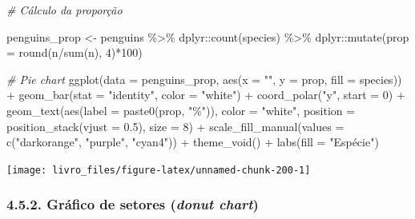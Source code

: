 \documentclass[
]{book}
\newenvironment{Shaded}{\begin{snugshade}}{\end{snugshade}}
\newcommand{\AttributeTok}[1]{\textcolor[rgb]{0.61,0.61,0.61}{#1}}
\newcommand{\CommentTok}[1]{\textcolor[rgb]{0.37,0.37,0.37}{\textit{#1}}}
\newcommand{\DecValTok}[1]{\textcolor[rgb]{0.06,0.06,0.06}{#1}}
\newcommand{\FloatTok}[1]{\textcolor[rgb]{0.06,0.06,0.06}{#1}}
\newcommand{\FunctionTok}[1]{\textcolor[rgb]{0,0,0}{#1}}
\newcommand{\NormalTok}[1]{#1}
\newcommand{\OtherTok}[1]{\textcolor[rgb]{0.37,0.37,0.37}{#1}}
\newcommand{\SpecialCharTok}[1]{\textcolor[rgb]{0,0,0}{#1}}
\newcommand{\StringTok}[1]{\textcolor[rgb]{0.5,0.5,0.5}{#1}}
\begin{document}
\begin{Shaded}
\begin{Highlighting}[]
\CommentTok{\# Cálculo da proporção}

\NormalTok{penguins\_prop }\OtherTok{\textless{}{-}}\NormalTok{ penguins }\SpecialCharTok{\%\textgreater{}\%}
\NormalTok{  dplyr}\SpecialCharTok{::}\FunctionTok{count}\NormalTok{(species) }\SpecialCharTok{\%\textgreater{}\%} 
\NormalTok{  dplyr}\SpecialCharTok{::}\FunctionTok{mutate}\NormalTok{(}\AttributeTok{prop =} \FunctionTok{round}\NormalTok{(n}\SpecialCharTok{/}\FunctionTok{sum}\NormalTok{(n), }\DecValTok{4}\NormalTok{)}\SpecialCharTok{*}\DecValTok{100}\NormalTok{)}

\CommentTok{\# Pie chart}
\FunctionTok{ggplot}\NormalTok{(}\AttributeTok{data =}\NormalTok{ penguins\_prop, }\FunctionTok{aes}\NormalTok{(}\AttributeTok{x =} \StringTok{""}\NormalTok{, }\AttributeTok{y =}\NormalTok{ prop, }\AttributeTok{fill =}\NormalTok{ species)) }\SpecialCharTok{+} 
  \FunctionTok{geom\_bar}\NormalTok{(}\AttributeTok{stat =} \StringTok{"identity"}\NormalTok{, }\AttributeTok{color =} \StringTok{"white"}\NormalTok{) }\SpecialCharTok{+}
  \FunctionTok{coord\_polar}\NormalTok{(}\StringTok{"y"}\NormalTok{, }\AttributeTok{start =} \DecValTok{0}\NormalTok{) }\SpecialCharTok{+}
  \FunctionTok{geom\_text}\NormalTok{(}\FunctionTok{aes}\NormalTok{(}\AttributeTok{label =} \FunctionTok{paste0}\NormalTok{(prop, }\StringTok{"\%"}\NormalTok{)), }\AttributeTok{color =} \StringTok{"white"}\NormalTok{, }
            \AttributeTok{position =} \FunctionTok{position\_stack}\NormalTok{(}\AttributeTok{vjust =} \FloatTok{0.5}\NormalTok{), }\AttributeTok{size =} \DecValTok{8}\NormalTok{) }\SpecialCharTok{+}
  \FunctionTok{scale\_fill\_manual}\NormalTok{(}\AttributeTok{values =} \FunctionTok{c}\NormalTok{(}\StringTok{"darkorange"}\NormalTok{, }\StringTok{"purple"}\NormalTok{, }\StringTok{"cyan4"}\NormalTok{)) }\SpecialCharTok{+}
  \FunctionTok{theme\_void}\NormalTok{() }\SpecialCharTok{+}
  \FunctionTok{labs}\NormalTok{(}\AttributeTok{fill =} \StringTok{"Espécie"}\NormalTok{)}
\end{Highlighting}
\end{Shaded}

\begin{center}\texttt{[image: livro\_files/figure-latex/unnamed-chunk-200-1]} \end{center}

\hypertarget{gruxe1fico-de-setores-donut-chart}{%
\subsubsection{\texorpdfstring{4.5.2. Gráfico de setores (\emph{donut chart})}{4.5.2. Gráfico de setores (donut chart)}}\label{gruxe1fico-de-setores-donut-chart}}
\end{document}
